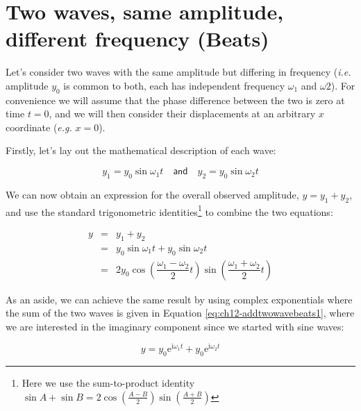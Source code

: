 \documentclass[
]{book}
\begin{document}
\hypertarget{sec:ch12-twowavesbeats1}{%
\section{Two waves, same amplitude, different frequency (Beats)}\label{sec:ch12-twowavesbeats1}}

Let's consider two waves with the same amplitude but differing in frequency (\emph{i.e.} amplitude \(y_0\) is common to both, each has independent frequency \(\omega_1\) and \(\omega 2\)). For convenience we will assume that the phase difference between the two is zero at time \(t=0\), and we will then consider their displacements at an arbitrary \(x\) coordinate (\emph{e.g.} \(x=0\)).

Firstly, let's lay out the mathematical description of each wave:

\begin{equation}
y_{1} = y_{0} \sin \omega_{1} t \quad \textsf{and} \quad y_{2} = y_{0} \sin \omega_{2} t
\label{eq:ch12-addtwowavebeats1}
\end{equation}

We can now obtain an expression for the overall observed amplitude, \(y = y_1 + y_2\), and use the standard trigonometric identities\footnote{Here we use the sum-to-product identity \(\sin A + \sin B = 2\cos \left(\frac{A-B}{2}\right) \sin\left(\frac{A+B}{2}\right)\)} to combine the two equations:

\begin{equation}
\begin{array}{rcl}
y &=& y_1 + y_2 \\
 &=& y_{0} \sin \omega_{1} t +  y_{0} \sin \omega_{2} t \\
 &=& 2y_{0}\cos\left(\dfrac{\omega_{1}-\omega_{2}}{2}t\right)\sin\left(\dfrac{\omega_{1}+\omega_{2}}{2}t\right)
\end{array}
\label{eq:ch12-addtwowavebeats2}
\end{equation}

As an aside, we can achieve the same result by using complex exponentials where the sum of the two waves is given in Equation \eqref{eq:ch12-addtwowavebeats1}, where we are interested in the imaginary component since we started with sine waves:

\begin{equation}
y = y_0 \mathrm{e}^{\mathrm{i}\omega_1 t} + y_0\mathrm{e}^{\mathrm{i}\omega_2 t}
\label{eq:ch12-addtwowavebeats3}
\end{equation}
\end{document}
